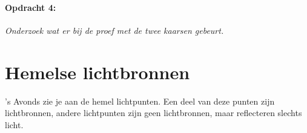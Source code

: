 \paragraph*{Opdracht 4:}

\emph{Onderzoek wat er bij de proef met de twee kaarsen gebeurt.}

\newpage{}


\section{Hemelse lichtbronnen}

's Avonds zie je aan de hemel lichtpunten. Een deel van deze punten
zijn lichtbronnen, andere lichtpunten zijn geen lichtbronnen, maar
reflecteren slechts licht.


